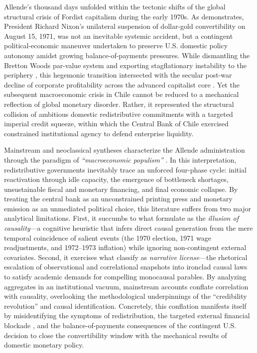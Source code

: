 Allende's thousand days unfolded within the tectonic shifts of the global structural crisis of Fordist capitalism during the early 1970s. As \citet{Zoeller2019} demonstrates, President Richard Nixon's unilateral suspension of dollar-gold convertibility on August 15, 1971, was not an inevitable systemic accident, but a contingent political-economic maneuver undertaken to preserve U.S. domestic policy autonomy amidst growing balance-of-payments pressures. While dismantling the Bretton Woods par-value system and exporting stagflationary instability to the periphery \citep{Vernengo2021}, this hegemonic transition intersected with the secular post-war decline of corporate profitability across the advanced capitalist core \citep{Weisskopf1979,BowlesGordonWeisskopf1983,Vidal2019}. Yet the subsequent macroeconomic crisis in Chile cannot be reduced to a mechanical reflection of global monetary disorder. Rather, it represented the structural collision of ambitious domestic redistributive commitments with a targeted imperial credit squeeze, within which the Central Bank of Chile exercised constrained institutional agency to defend enterprise liquidity.

Mainstream and neoclassical syntheses characterize the Allende administration through the paradigm of \textit{``macroeconomic populism''} \citep{DornbuschEdwards1990,LarrainMeller1991}. In this interpretation, redistributive governments inevitably trace an unforced four-phase cycle: initial reactivation through idle capacity, the emergence of bottleneck shortages, unsustainable fiscal and monetary financing, and final economic collapse. By treating the central bank as an unconstrained printing press and monetary emission as an unmediated political choice, this literature suffers from two major analytical limitations. First, it succumbs to what \citet{BlancoMatute2018} formulate as the \emph{illusion of causality}---a cognitive heuristic that infers direct causal generation from the mere temporal coincidence of salient events (the 1970 election, 1971 wage readjustments, and 1972--1973 inflation) while ignoring non-contingent external covariates. Second, it exercises what \citet{IschEtAl2026} classify as \emph{narrative license}---the rhetorical escalation of observational and correlational snapshots into ironclad causal laws to satisfy academic demands for compelling monocausal parables. By analyzing aggregates in an institutional vacuum, mainstream accounts conflate correlation with causality, overlooking the methodological underpinnings of the ``credibility revolution'' and causal identification. Concretely, this conflation manifests itself by misidentifying the symptoms of redistribution, the targeted external financial blockade \citep{DeVylder1976,PetrasMorley1975}, and the balance-of-payments consequences of the contingent U.S. decision to close the convertibility window with the mechanical results of domestic monetary policy.

